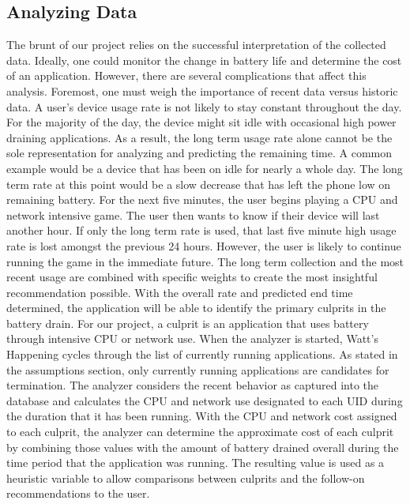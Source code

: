 \documentclass[11pt,twocolumn]{article}
\begin{document}
\subsection*{Analyzing Data}
The brunt of our project relies on the successful interpretation of the collected data.  
Ideally, one could monitor the change in battery life and determine the cost of an application.  
However, there are several complications that affect this analysis.  
Foremost, one must weigh the importance of recent data versus historic data.  
A user's device usage rate is not likely to stay constant throughout the day.  
For the majority of the day, the device might sit idle with occasional high power draining applications. 
As a result, the long term usage rate alone cannot be the sole representation for analyzing and predicting the remaining time.  
A common example would be a device that has been on idle for nearly a whole day.  
The long term rate at this point would be a slow decrease that has left the phone low on remaining battery.  
For the next five minutes, the user begins playing a CPU and network intensive game.  
The user then wants to know if their device will last another hour.  
If only the long term rate is used, that last five minute high usage rate is lost amongst the previous 24 hours.  
However, the user is likely to continue running the game in the immediate future.  
The long term collection and the most recent usage are combined with specific weights to create the most insightful recommendation possible. 
With the overall rate and predicted end time determined, the application will be able to identify the primary culprits in the battery drain.  
For our project, a culprit is an application that uses battery through intensive CPU or network use.  
When the analyzer is started, Watt's Happening cycles through the list of currently running applications.  
As stated in the assumptions section, only currently running applications are candidates for termination.  
The analyzer considers the recent behavior as captured into the database and calculates the CPU and network use designated to each UID during the duration that it has been running.  
With the CPU and network cost assigned to each culprit, the analyzer can determine the approximate cost of each culprit by combining those values with the amount of battery drained overall during the time period that the application was running.  
The resulting value is used as a heuristic variable to allow comparisons between culprits and the follow-on recommendations to the user.
\end{document}
